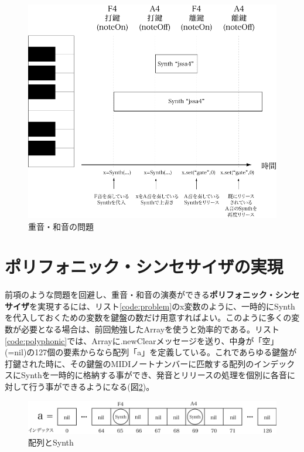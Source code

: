 \documentclass{jsarticle}
\begin{document}
\begin{figure}[htbp]
  \begin{center} 
    \includegraphics[scale=0.55]{poly_problem.pdf}
  \end{center} 
  \caption{重音・和音の問題}
  \label{fig:Synth_problem}
\end{figure}

\section{ポリフォニック・シンセサイザの実現}

前項のような問題を回避し、重音・和音の演奏ができる{\bf ポリフォニック・シンセサイザ}を実現するには、リスト\ref{code:problem}のx変数のように、一時的にSynthを代入しておくための変数を鍵盤の数だけ用意すればよい。このように多くの変数が必要となる場合は、前回勉強したArrayを使うと効率的である。リスト\ref{code:polyphonic}では、Arrayに.newClearメッセージを送り、中身が「空」(=nil)の127個の要素からなら配列「a」を定義している。これであらゆる鍵盤が打鍵された時に、その鍵盤のMIDIノートナンバーに匹敵する配列のインデックスにSynthを一時的に格納する事ができ、発音とリリースの処理を個別に各音に対して行う事ができるようになる(図\ref{fig:array})。

\begin{figure}[htbp]
  \begin{center}
    \includegraphics[scale = 0.38]{array.pdf}
  \end{center}
  \caption{配列とSynth}
  \label{fig:array}
\end{figure}
\end{document}

